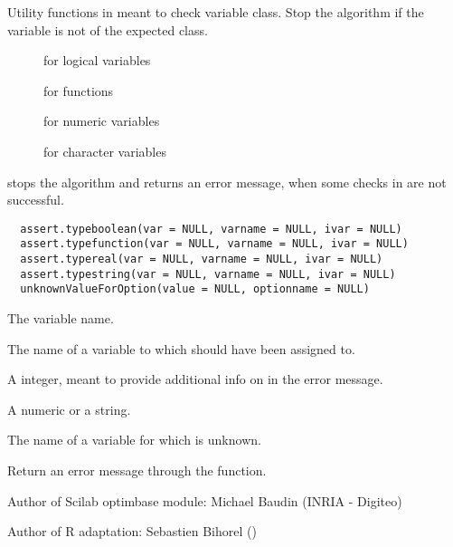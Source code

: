 %
\begin{Description}\relax
Utility functions in  meant to check variable class. Stop the
algorithm if the  variable is not of the expected class.\begin{description}

\item[] for logical variables
\item[] for functions
\item[] for numeric variables
\item[] for character variables

\end{description}

 stops the algorithm and returns an error
message, when some checks in  are not successful.
\end{Description}
%
\begin{Usage}
\begin{verbatim}
  assert.typeboolean(var = NULL, varname = NULL, ivar = NULL)
  assert.typefunction(var = NULL, varname = NULL, ivar = NULL)
  assert.typereal(var = NULL, varname = NULL, ivar = NULL)
  assert.typestring(var = NULL, varname = NULL, ivar = NULL)
  unknownValueForOption(value = NULL, optionname = NULL)
\end{verbatim}
\end{Usage}
%
\begin{Arguments}
\begin{ldescription}
\item[\code{var}] The variable name.
\item[\code{varname}] The name of a variable to which  should have been
assigned to.
\item[\code{ivar}] A integer, meant to provide additional info on  in
the error message.
\item[\code{value}] A numeric or a string.
\item[\code{optionname}] The name of a variable for which  is unknown.
\end{ldescription}
\end{Arguments}
%
\begin{Value}
Return an error message through the  function.
\end{Value}
%
\begin{Author}\relax
Author of Scilab optimbase module: Michael Baudin (INRIA - Digiteo)

Author of R adaptation: Sebastien Bihorel ()
\end{Author}
